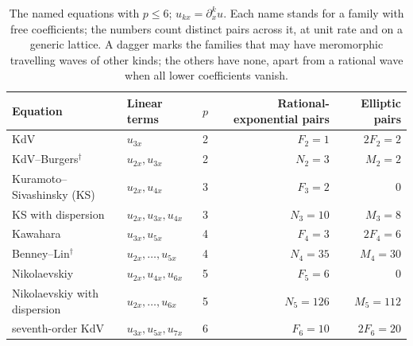 \documentclass[11pt]{article}
\theoremstyle{definition}
\theoremstyle{remark}
\numberwithin{equation}{section}
\begin{document}
\begin{table}[htbp]
\centering
\caption{The named equations with \(p\le6\); \(u_{kx}=\partial_x^ku\).
Each name stands for a family with free coefficients; the numbers count
distinct pairs across it, at unit rate and on a generic lattice. A dagger
marks the families that may have meromorphic travelling waves of other
kinds; the others have none, apart from a rational wave when all lower
coefficients vanish.}
\label{tab:named}
\vspace{4pt}
\begin{tabular}{@{}llcrr@{}}
\toprule
Equation&Linear terms&\(p\)&Rational-exponential pairs&Elliptic pairs\\
\midrule
KdV&\(u_{3x}\)&2&\(F_2=1\)&\(2F_2=2\)\\
KdV--Burgers\(^\dagger\)&\(u_{2x},u_{3x}\)&2&\(N_2=3\)&\(M_2=2\)\\
Kuramoto--Sivashinsky (KS)&\(u_{2x},u_{4x}\)&3&\(F_3=2\)&\(0\)\\
KS with dispersion&\(u_{2x},u_{3x},u_{4x}\)&3&\(N_3=10\)&\(M_3=8\)\\
Kawahara&\(u_{3x},u_{5x}\)&4&\(F_4=3\)&\(2F_4=6\)\\
Benney--Lin\(^\dagger\)&\(u_{2x},\ldots,u_{5x}\)&4&\(N_4=35\)&\(M_4=30\)\\
Nikolaevskiy&\(u_{2x},u_{4x},u_{6x}\)&5&\(F_5=6\)&\(0\)\\
Nikolaevskiy with dispersion&\(u_{2x},\ldots,u_{6x}\)&5&\(N_5=126\)&\(M_5=112\)\\
seventh-order KdV&\(u_{3x},u_{5x},u_{7x}\)&6&\(F_6=10\)&\(2F_6=20\)\\
\bottomrule
\end{tabular}
\end{table}
\end{document}
